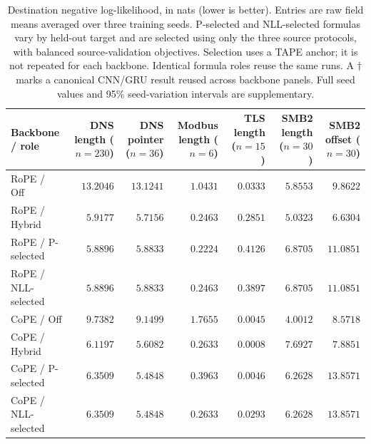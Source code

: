 \begin{table}[tb]
\centering
\small
\setlength{\tabcolsep}{5pt}
\caption{Destination negative log-likelihood, in nats (lower is better). Entries are raw field means averaged over three training seeds. P-selected and NLL-selected formulas vary by held-out target and are selected using only the three source protocols, with balanced source-validation objectives. Selection uses a TAPE anchor; it is not repeated for each backbone. Identical formula roles reuse the same runs. A $\dagger$ marks a canonical CNN/GRU result reused across backbone panels. Full seed values and 95\% seed-variation intervals are supplementary.}
\label{tab:lapa-v17-nll}
\begin{tabular}{l*{6}{r}}
\toprule
Backbone / role & \shortstack{DNS\\length\\($n=230$)} & \shortstack{DNS\\pointer\\($n=36$)} & \shortstack{Modbus\\length\\($n=6$)} & \shortstack{TLS\\length\\($n=15$)} & \shortstack{SMB2\\length\\($n=30$)} & \shortstack{SMB2\\offset\\($n=30$)} \\
\midrule
RoPE / Off & $13.2046$ & $13.1241$ & $1.0431$ & $0.0333$ & $5.8553$ & $9.8622$ \\
RoPE / Hybrid & $5.9177$ & $5.7156$ & $0.2463$ & $0.2851$ & $5.0323$ & $6.6304$ \\
RoPE / P-selected & $5.8896$ & $5.8833$ & $0.2224$ & $0.4126$ & $6.8705$ & $11.0851$ \\
RoPE / NLL-selected & $5.8896$ & $5.8833$ & $0.2463$ & $0.3897$ & $6.8705$ & $11.0851$ \\
\addlinespace[3pt]
CoPE / Off & $9.7382$ & $9.1499$ & $1.7655$ & $0.0045$ & $4.0012$ & $8.5718$ \\
CoPE / Hybrid & $6.1197$ & $5.6082$ & $0.2633$ & $0.0008$ & $7.6927$ & $7.8851$ \\
CoPE / P-selected & $6.3509$ & $5.4848$ & $0.3963$ & $0.0046$ & $6.2628$ & $13.8571$ \\
CoPE / NLL-selected & $6.3509$ & $5.4848$ & $0.2633$ & $0.0293$ & $6.2628$ & $13.8571$ \\

\end{tabular}
\end{table}
